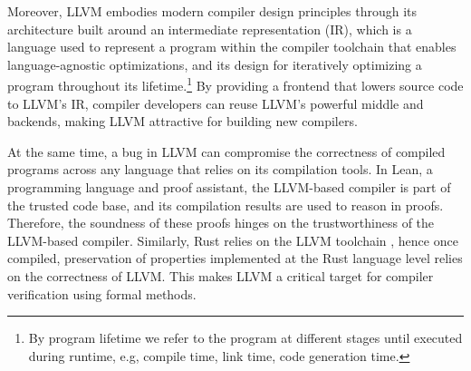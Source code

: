\documentclass[review, anonymous, acmsmall, screen]{acmart}
\begin{document}
Moreover, LLVM embodies modern compiler design principles through its architecture built around an 
intermediate representation (IR), which is a language used to represent a program within the compiler 
toolchain that enables language-agnostic optimizations, and its design for iteratively optimizing a 
program throughout its lifetime.\footnote{By program lifetime we refer to the program at different stages
until executed during runtime, e.g, compile time, link time, code generation time.} By providing a frontend
that lowers source code to LLVM's IR, compiler developers can reuse LLVM's powerful middle and backends,
making LLVM attractive for building new compilers.

At the same time, a bug in LLVM can compromise the correctness of compiled programs across any language
that relies on its compilation tools. In Lean, a programming language and proof assistant, the LLVM-based
compiler is part of the trusted code base, and its compilation results are used to reason in proofs. 
Therefore, the soundness of these proofs hinges on the trustworthiness of the LLVM-based compiler. Similarly,
Rust relies on the LLVM toolchain \cite{Rustlantis}, hence once compiled, preservation of properties 
implemented at the Rust language level relies on the correctness of LLVM. This makes LLVM a critical 
target for compiler verification using formal methods.
\end{document}
